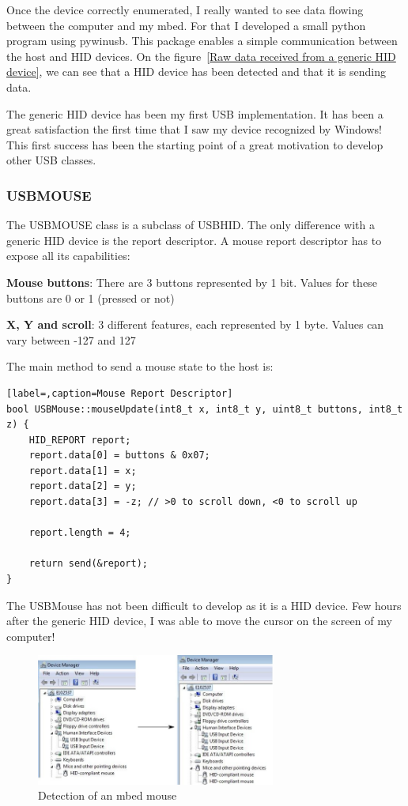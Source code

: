 \documentclass[pdftex,10pt,a4paper]{report}
\newenvironment{packed_item}{
\begin{itemize}
  \setlength{\itemsep}{1pt}
  \setlength{\parskip}{0pt}
  \setlength{\parsep}{0pt}
}{\end{itemize}}
\begin{document}
Once the device correctly enumerated, I really wanted to see data flowing between the computer and my mbed. For that I developed a small python program using pywinusb. This package enables a simple communication between the host and HID devices. On the figure~\ref{Raw data received from a generic HID device}, we can see that a HID device has been detected and that it is sending data.

The generic HID device has been my first USB implementation. It has been a great satisfaction the first time that I saw my device recognized by Windows! This first success has been the starting point of a great motivation to develop other USB classes. 


\subsubsection{USBMOUSE}
The USBMOUSE class is a subclass of USBHID. The only difference with a generic HID device is the report descriptor. A mouse report descriptor has to expose all its capabilities:
\begin{packed_item}
	\item \textbf{Mouse buttons}: There are 3 buttons represented by 1 bit. Values for these buttons are 0 or 1 (pressed or not)
	\item \textbf{X, Y and scroll}: 3 different features, each represented by 1 byte. Values can vary between -127 and 127
\end{packed_item}

The main method to send a mouse state to the host is:
\begin{lstlisting}[label=,caption=Mouse Report Descriptor]
bool USBMouse::mouseUpdate(int8_t x, int8_t y, uint8_t buttons, int8_t z) {
    HID_REPORT report;
    report.data[0] = buttons & 0x07;
    report.data[1] = x;
    report.data[2] = y;
    report.data[3] = -z; // >0 to scroll down, <0 to scroll up

    report.length = 4;

    return send(&report);
}
\end{lstlisting}

The USBMouse has not been difficult to develop as it is a HID device. Few hours after the generic HID device, I was able to move the cursor on the screen of my computer!

\begin{figure}[h!]
		\centering
		\includegraphics[width=0.7\textwidth]{./mouse_dev_manager.jpg}
		\caption{Detection of an mbed mouse}
		\label{Detection of an mbed mouse}
\end{figure}
\end{document}

